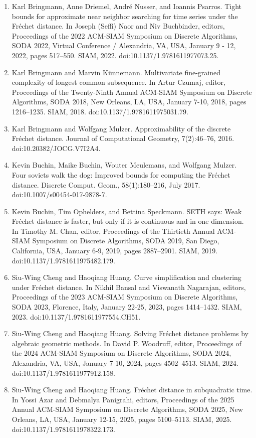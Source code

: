 \documentclass[10pt,a4paper]{article}
\begin{document}
\begin{enumerate}
\item[]  [8]  Karl Bringmann, Anne Driemel, André Nusser, and Ioannis Psarros.  Tight bounds for approximate near neighbor searching for time series under the Fréchet distance.  In Joseph (Seffi) Naor and Niv Buchbinder, editors, Proceedings of the 2022 ACM-SIAM Symposium on Discrete Algorithms, SODA 2022, Virtual Conference / Alexandria, VA, USA, January 9 - 12, 2022, pages 517–550. SIAM, 2022.  doi:10.1137/1.9781611977073.25.  
\item[]  [9]  Karl Bringmann and Marvin Künnemann.  Multivariate fine-grained complexity of longest common subsequence.  In Artur Czumaj, editor, Proceedings of the Twenty-Ninth Annual ACM-SIAM Symposium on Discrete Algorithms, SODA 2018, New Orleans, LA, USA, January 7-10, 2018, pages 1216–1235. SIAM, 2018.  doi:10.1137/1.9781611975031.79.  
\item[]  [10]  Karl Bringmann and Wolfgang Mulzer.  Approximability of the discrete Fréchet distance.  Journal of Computational Geometry, 7(2):46–76, 2016.  doi:10.20382/JOCG.V7I2A4.  
\item[]  [11]  Kevin Buchin, Maike Buchin, Wouter Meulemans, and Wolfgang Mulzer.  Four soviets walk the dog: Improved bounds for computing the Fréchet distance.  Discrete Comput. Geom., 58(1):180–216, July 2017.  doi:10.1007/s00454-017-9878-7.  
\item[]  [12]  Kevin Buchin, Tim Ophelders, and Bettina Speckmann.  SETH says: Weak Fréchet distance is faster, but only if it is continuous and in one dimension.  In Timothy M. Chan, editor, Proceedings of the Thirtieth Annual ACM-SIAM Symposium on Discrete Algorithms, SODA 2019, San Diego, California, USA, January 6-9, 2019, pages 2887–2901. SIAM, 2019.  doi:10.1137/1.9781611975482.179.  
\item[]  [13]  Siu-Wing Cheng and Haoqiang Huang.  Curve simplification and clustering under Fréchet distance.  In Nikhil Bansal and Viswanath Nagarajan, editors, Proceedings of the 2023 ACM-SIAM Symposium on Discrete Algorithms, SODA 2023, Florence, Italy, January 22-25, 2023, pages 1414–1432. SIAM, 2023.  doi:10.1137/1.9781611977554.CH51.  
\item[]  [14]  Siu-Wing Cheng and Haoqiang Huang.  Solving Fréchet distance problems by algebraic geometric methods.  In David P. Woodruff, editor, Proceedings of the 2024 ACM-SIAM Symposium on Discrete Algorithms, SODA 2024, Alexandria, VA, USA, January 7-10, 2024, pages 4502–4513. SIAM, 2024.  doi:10.1137/1.9781611977912.158.  
\item[]  [15]  Siu-Wing Cheng and Haoqiang Huang.  Fréchet distance in subquadratic time.  In Yossi Azar and Debmalya Panigrahi, editors, Proceedings of the 2025 Annual ACM-SIAM Symposium on Discrete Algorithms, SODA 2025, New Orleans, LA, USA, January 12-15, 2025, pages 5100–5113. SIAM, 2025.  doi:10.1137/1.9781611978322.173.  

\end{enumerate}
\end{document}

